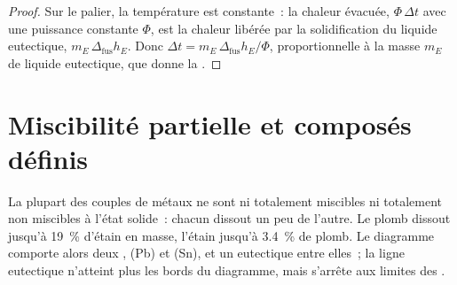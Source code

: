 \begin{proof}
Sur le palier, la température est constante~: la chaleur évacuée, $\Phi\,\Delta t$
avec une puissance constante $\Phi$, est la chaleur libérée par la solidification du
liquide eutectique, $m_E\,\Delta_{\text{fus}}h_E$. Donc $\Delta t = m_E\,\Delta_{\text{fus}}h_E/
\Phi$, proportionnelle à la masse $m_E$ de liquide eutectique, que donne la .
\end{proof}

\section{Miscibilité partielle et composés définis}

La plupart des couples de métaux ne sont ni totalement miscibles ni totalement non miscibles à l'état
solide~: chacun dissout un peu de l'autre. Le plomb dissout jusqu'à 19~\% d'étain
en masse, l'étain jusqu'à 3.4~\% de plomb. Le diagramme comporte alors deux , (Pb) et (Sn), et un eutectique entre elles~; la ligne eutectique
n'atteint plus les bords du diagramme, mais s'arrête aux limites des .

